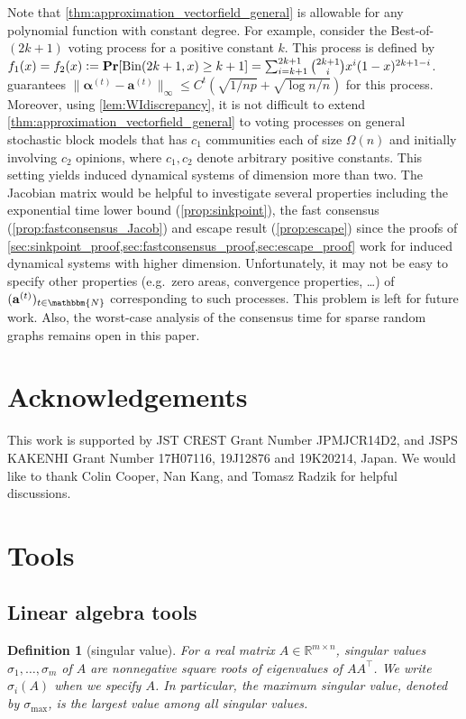 \documentclass[letterpaper,11pt]{article}
\newtheorem{definition}[theorem]{Definition}
\renewcommand\Pr{\mathop{\mathbf{Pr}}}
\def\defeq{\mathrel{\mathop:}=}%
\begin{document}
Note that \cref{thm:approximation_vectorfield_general} is allowable for any polynomial function with constant degree.
For example, consider the Best-of-$(2k+1)$ voting process for a positive constant $k$.
This process is defined by $f_1(x)=f_2(x)\defeq \Pr[{\rm Bin}(2k+1,x)\geq k+1]=\sum_{i=k+1}^{2k+1}\binom{2k+1}{i}x^i(1-x)^{2k+1-i}$.
 guarantees $\|{\boldsymbol \alpha}^{(t)}-\mathbf{a}^{(t)}\|_\infty\leq C^t(\sqrt{1/np}+\sqrt{\log n/n})$ for this process.
Moreover, using \cref{lem:WIdiscrepancy}, it is not difficult to extend \cref{thm:approximation_vectorfield_general} to voting processes on general stochastic block models that has $c_1$ communities each of size $\Omega(n)$ and initially involving $c_2$ opinions, where $c_1, c_2$ denote arbitrary positive constants.
This setting yields induced dynamical systems of dimension more than two.
The Jacobian matrix would be helpful to investigate several properties including the exponential time lower bound (\cref{prop:sinkpoint}), the fast consensus (\cref{prop:fastconsensus_Jacob}) and escape result (\cref{prop:escape}) since the proofs of \cref{sec:sinkpoint_proof,sec:fastconsensus_proof,sec:escape_proof} work for induced dynamical systems with higher dimension.
Unfortunately, it may not be easy to specify other properties (e.g.~zero areas, convergence properties, \ldots) of $(\mathbf{a}^{(t)})_{t\in \mathbbm{N}}$ corresponding to such processes.
This problem is left for future work.
Also, the worst-case analysis of the consensus time for sparse random graphs remains open in this paper.

\section*{Acknowledgements}
This work is supported by JST CREST Grant Number JPMJCR14D2, and JSPS KAKENHI Grant Number 17H07116, 19J12876 and 19K20214, Japan.
We would like to thank Colin Cooper, Nan Kang, and Tomasz Radzik for helpful discussions.





\appendix
\section{Tools}
\subsection{Linear algebra tools} \label{sec:linearalgebra}
\begin{definition}[singular value]
For a real matrix $A\in \mathbb{R}^{m\times n}$, \emph{singular values} $\sigma_1,\ldots,\sigma_m$ of $A$ are nonnegative square roots of eigenvalues of $AA^\top$.
We write $\sigma_i(A)$ when we specify $A$.
In particular, \emph{the maximum singular value}, denoted by $\sigma_{\max}$, is the largest value among all singular values.
\end{definition}
\end{document}
